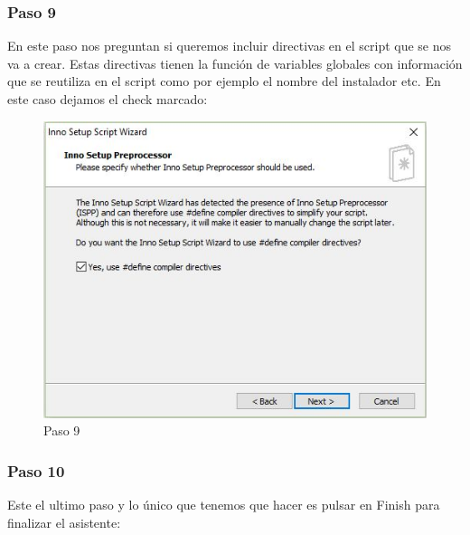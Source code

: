 \newpage

\subsubsection{Paso 9}

En este paso nos preguntan si queremos incluir directivas en el script que se nos va a crear. Estas directivas tienen la función de variables globales con información que se reutiliza en el script como por ejemplo el nombre del instalador etc. En este caso dejamos el check marcado:

\begin{figure}[H]
	\centering\includegraphics[scale=0.5]{imagenes/implementacion/9.jpg}
	\caption{Paso 9}
	\label{instaladorPaso9}
\end{figure}

\subsubsection{Paso 10}

Este el ultimo paso y lo único que tenemos que hacer es pulsar en Finish para finalizar el asistente:


